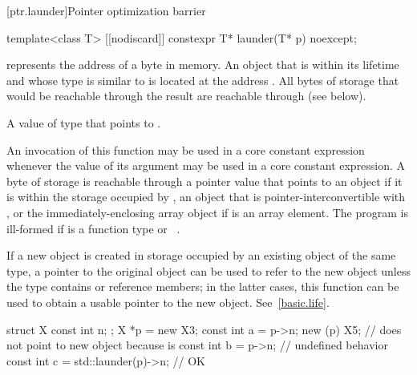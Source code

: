 [ptr.launder]{Pointer optimization barrier}

%
\begin{itemdecl}
template<class T> [[nodiscard]] constexpr T* launder(T* p) noexcept;
\end{itemdecl}

\begin{itemdescr}
\pnum
\requires
{} represents the address  of a byte in memory.
An object  that is within its lifetime
and whose type is similar to 
is located at the address .
All bytes of storage that would be reachable through the result
are reachable through  (see below).

\pnum
\returns
A value of type  that points to .

\pnum
\remarks
An invocation of this function
may be used in a core constant expression
whenever the value of its argument
may be used in a core constant expression.
A byte of storage is
reachable through a pointer value
that points to an object 
if it is within the storage occupied by
,
an object that is pointer-interconvertible with , or
the immediately-enclosing array object if  is an array element.
The program is ill-formed if  is a function type
or \cv{}~.

\pnum
\begin{note}
If a new object is created
in storage occupied by an existing object of the same type,
a pointer to the original object
can be used to refer to the new object
unless the type contains  or reference members;
in the latter cases,
this function can be used to obtain a usable pointer to the new object.
See~\ref{basic.life}.
\end{note}

\pnum
\begin{example}
\begin{codeblock}
struct X { const int n; };
X *p = new X{3};
const int a = p->n;
new (p) X{5};                       //  does not point to new object because  is 
const int b = p->n;                 // undefined behavior
const int c = std::launder(p)->n;   // OK
\end{codeblock}
\end{example}
\end{itemdescr}

